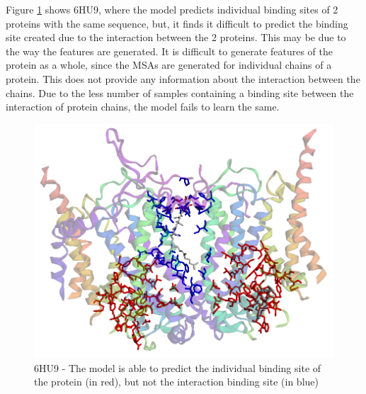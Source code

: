 \documentclass[journal=jacsat,manuscript=article]{achemso}
\begin{document}
Figure \ref{fig:6hu9} shows 6HU9\cite{maldonado2021atomic}, where the model predicts individual binding sites of 2 proteins with the same sequence, but, it finds it difficult to predict the binding site created due to the interaction between the 2 proteins. This may be due to the way the features are generated. It is difficult to generate features of the protein as a whole, since the MSAs are generated for individual chains of a protein. This does not provide any information about the interaction between the chains. Due to the less number of samples containing a binding site between the interaction of protein chains, the model fails to learn the same.
\begin{figure}
    \centering
    \noindent\includegraphics[scale=0.35]{6hu9.png}
    \caption{\centering 6HU9 - The model is able to predict the individual binding site of the protein  (in red), but not the interaction binding site (in blue)}
    \label{fig:6hu9}
\end{figure}
\end{document}
